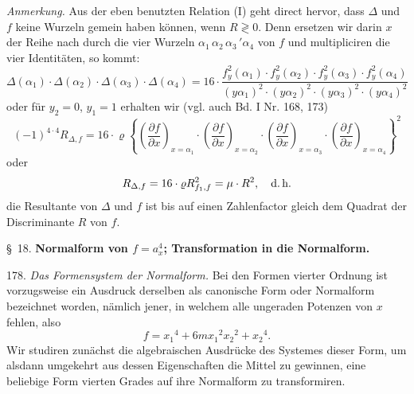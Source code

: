 \textit{Anmerkung.} Aus der eben benutzten Relation (I) geht direct hervor, dass $\Delta$ und $f$ keine Wurzeln gemein haben können, wenn $R\gtrless 0$. Denn ersetzen wir darin $x$ der Reihe nach durch die vier Wurzeln $\alpha_1\,\alpha_2\,\alpha_3\,'\alpha_4$ von $f$ und multipliciren die vier Identitäten, so kommt: %
\[
\Delta(\alpha_1)\cdot\Delta(\alpha_2)\cdot\Delta(\alpha_3)\cdot\Delta(\alpha_4)=16\cdot\frac{f_y^2(\alpha_1)\cdot f_y^2(\alpha_2)\cdot f_y^2(\alpha_3)\cdot f_y^2(\alpha_4)}{(y\alpha_1)^2\cdot(y\alpha_2)^2\cdot(y\alpha_3)^2\cdot(y\alpha_4)^2}
\]
oder für $y_2=0$, $y_1=1$ erhalten wir (vgl. auch Bd. I Nr. 168, 173)
\[
(-1)^{4\cdot4}R_{\Delta,f}=16\cdot\varrho\left\{\left(\frac{\partial f}{\partial x}\right)_{x=\alpha_1}\cdot\left(\frac{\partial f}{\partial x}\right)_{x=\alpha_2}\cdot\left(\frac{\partial f}{\partial x}\right)_{x=\alpha_3}\cdot\left(\frac{\partial f}{\partial x}\right)_{x=\alpha_4}\right\}^2
\]
oder
\[
R_{\Delta,f}=16\cdot\varrho R_{f_1,f}^2=\mu\cdot R^2,\quad\text{d.\,h.}
\]
\glqq die Resultante von $\Delta$ und $f$ ist bis auf einen Zahlenfactor gleich dem Quadrat der Discriminante $R$ von $f$.\grqq{}


\S~18. \textbf{Normalform von $f=a_x^4$; Transformation in die Normalform.}

178. \textit{Das Formensystem der Normalform.} Bei den Formen vierter Ordnung ist vorzugsweise ein Ausdruck derselben als canonische Form oder Normalform bezeichnet worden, nämlich jener, in welchem alle ungeraden Potenzen von $x$ fehlen, also
\[
f=x_1{}^4+6mx_1{}^2x_2{}^2+x_2{}^4.
\]
Wir studiren zunächst die algebraischen Ausdrücke des Systemes dieser Form, um alsdann umgekehrt aus dessen Eigenschaften die Mittel zu gewinnen, eine beliebige Form vierten Grades auf ihre Normalform zu transformiren.

